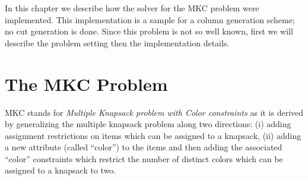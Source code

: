 In this chapter we describe how the solver for the MKC problem were
implemented. This implementation is a sample for a column generation scheme;
no cut generation is done. Since this problem is not so well known, first we
will describe the problem setting then the implementation details.


\section{The MKC Problem}
\label{mkc:problem}

MKC stands for {\em Multiple Knapsack problem with Color constraints} as it is
derived by generalizing the multiple knapsack problem along two directions:
(i) adding assignment restrictions on items which can be assigned to a
knapsack, (ii) adding a new attribute (called ``color'') to the items and then
adding the associated ``color'' constraints which restrict the number of
distinct colors which can be assigned to a knapsack to two.

